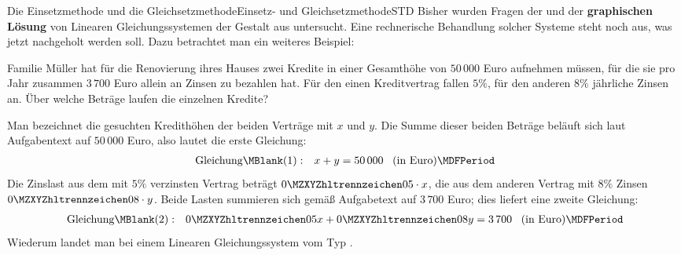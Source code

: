\begin{MXContent}{Die Einsetzmethode und die Gleichsetzmethode}{Einsetz- und Gleichsetzmethode}{STD}
Bisher wurden Fragen der  und der \textbf{graphischen Lösung} von
Linearen Gleichungssystemen der Gestalt aus  untersucht.%
Eine rechnerische Behandlung solcher Systeme steht noch aus, was jetzt nachgeholt werden soll.
Dazu betrachtet man ein weiteres Beispiel:
\begin{MExample}
Familie Müller hat für die Renovierung ihres Hauses zwei Kredite in einer Gesamthöhe von $50\,000$ Euro
aufnehmen müssen, für die sie pro Jahr zusammen $3\,700$ Euro allein an Zinsen zu bezahlen hat. Für den
einen Kreditvertrag fallen $5\%$, für den anderen $8\%$ jährliche Zinsen an. Über welche Beträge
laufen die einzelnen Kredite?

Man bezeichnet die gesuchten Kredithöhen der beiden Verträge mit $x$ und $y$. Die
Summe dieser beiden Beträge beläuft sich laut Aufgabentext auf $50\,000$ Euro, also lautet die erste Gleichung:
\begin{eqnarray*}
\mbox{Gleichung}\MBlank (1) & : & x + y = 50\,000 \; \; \; \mbox{(in Euro)}\MDFPeriod 
\end{eqnarray*}
Die Zinslast aus dem mit $5\%$ verzinsten Vertrag beträgt $\MZahl{0}{05} \cdot x$, die aus dem anderen Vertrag  mit $8\%$ Zinsen
$\MZahl{0}{08} \cdot y$. Beide Lasten summieren sich gemäß Aufgabetext auf $3\,700$ Euro; dies liefert eine zweite Gleichung:
\begin{eqnarray*}
\mbox{Gleichung}\MBlank (2) & : & \MZahl{0}{05} x + \MZahl{0}{08} y = 3\,700 \; \; \; \mbox{(in Euro)}\MDFPeriod 
\end{eqnarray*}
Wiederum landet man bei einem Linearen Gleichungssystem vom Typ .


\end{MExample}
\end{MXContent}
